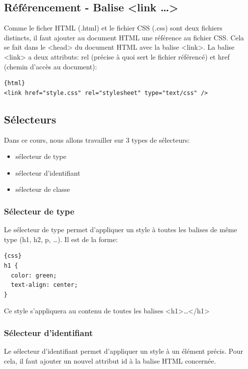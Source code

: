 \documentclass[a4paper,11pt]{article}
\begin{document}
\subsection{Référencement - Balise <link \dots>}
Comme le ficher HTML (.html) et le fichier CSS (.css) sont deux fichiers distincts, il faut ajouter au document HTML une référence au fichier CSS. Cela se fait dans le <head> du document HTML avec la balise <link>.
La balise <link> a deux attributs: rel (précise à quoi sert le fichier référencé) et href (chemin d'accès au document):
\begin{verbatim}{html}
<link href="style.css" rel="stylesheet" type="text/css" />
\end{verbatim}

\subsection{Sélecteurs}
Dans ce cours, nous allons travailler sur 3 types de sélecteurs:
\begin{itemize}
\item sélecteur de type
\item sélecteur d'identifiant
\item sélecteur de classe
\end{itemize}

\subsubsection{Sélecteur de type}
Le sélecteur de type permet d'appliquer un style à toutes les balises de même type (h1, h2, p, \dots).
Il est de la forme: \par
\begin{verbatim}{css}
h1 {
  color: green;
  text-align: center;
}
\end{verbatim}\par
Ce style s'appliquera au contenu de toutes les balises <h1>…</h1>

\subsubsection{Sélecteur d'identifiant}
Le sélecteur d'identifiant permet d'appliquer un style à un élément précis. Pour cela, il faut ajouter un nouvel attribut id à la balise HTML concernée.\par
\end{document}
